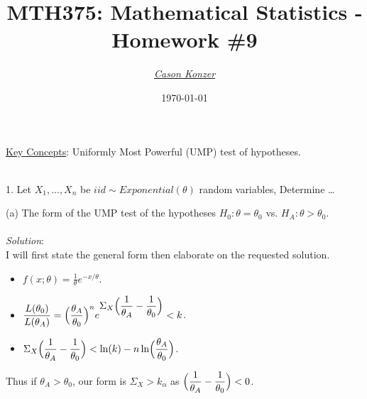 \documentclass[12pt]{article}
\newcommand{\XB}{\color{black}}
\newcommand{\XBB}{\color{blue}}
\newcommand{\XV}{\color{violet}}
\newcommand{\ds}{\displaystyle}
\begin{document}
\title{\textbf{MTH375}: Mathematical Statistics - Homework \#9}
\date{\today}
\author{\XV\textit{\large{\href{https://github.com/casonk}{Cason Konzer}}}\XB}

\maketitle
\hrulefill
\vfill
    \underline{Key Concepts}: Uniformly Most Powerful (UMP) test of hypotheses.

\newpage
\newpage
\XBB\hrulefill\XB \\

1. Let $ X_{1}, \dots , X_{n} $ be $ iid \sim Exponential(\theta) $ random variables, Determine \dots \\

\XBB\hrulefill\XB
\vspace{5mm}

(a) The form of the UMP test of the hypotheses $ H_{0} : \theta = \theta_{0} $ vs. $ H_{A} : \theta > \theta_{0} $. \\
\vspace{2.5mm} \\
\textit{Solution}:
\vspace{2.5mm} \\

\noindent
I will first state the general form then elaborate on the requested solution. \\

\begin{itemize}
    \item $ \ds f(x; \theta) = \frac{1}{\theta} e^{-x/\theta} $.
    \item $ \ds \frac{L(\theta_{0})}{L(\theta_{A})} = \Bigl( \frac{\theta_{A}}{\theta_{0}} \Bigr)^{n} e^{\ds \Sigma_{X} \Bigl( \frac{1}{\theta_{A}} - \frac{1}{\theta_{0}} \Bigr)} < k $.
    \item $ \ds \Sigma_{X} \Bigl( \frac{1}{\theta_{A}} - \frac{1}{\theta_{0}} \Bigr) < \ln(k) - n\ln\Bigl( \frac{\theta_{A}}{\theta_{0}} \Bigr) $.
\end{itemize}

\noindent
Thus if $ \theta_{A} > \theta_{0} $, our form is $ \Sigma_{X} > k_{\alpha} $ as $ \ds \Bigl( \frac{1}{\theta_{A}} - \frac{1}{\theta_{0}} \Bigr) < 0 $. \\
\end{document}

